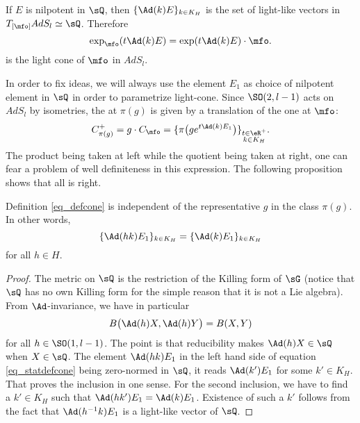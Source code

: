 \begin{corollary}		\label{CorNilLightQ}
If $E$ is nilpotent in $\sQ$, then $\{\Ad(k)E\}_{k\in K_H}$ is the set of light-like vectors in $T_{[\mfo]}AdS_l\simeq\sQ$. Therefore
\begin{equation}
  \exp_{\mfo}( t\Ad(k)E )=\exp(t\Ad(k)E)\cdot\mfo.
\end{equation}
is the light cone of $\mfo$ in $AdS_l$.
\end{corollary}

In order to fix ideas, we will always use the element $E_1$ as choice of nilpotent element in $\sQ$ in order to parametrize light-cone.  Since $\SO(2,l-1)$ acts on $AdS_l$ by isometries, the  at $\pi(g)$ is given by a translation of the one at $\mfo$:
\begin{equation}	\label{eq_defcone}
  C^+_{\pi(g)}=g\cdot C_{\mfo}=\{  \pi\big( g e^{t\Ad(k)E_1}  \big)  \}_{\substack{t\in\eR^+\\ k\in K_H}}.
\end{equation} 
The product being taken at left while the quotient being taken at right, one can fear a problem of well definiteness in this expression. The following proposition shows that all is right.

\begin{proposition}		\label{PropDefConeIndepRepre}
Definition \eqref{eq_defcone} is independent of the representative $g$ in the class $\pi(g)$. In other words,
\begin{equation}  \label{eq_statdefcone}
  \{ \Ad(hk)E_1 \}_{k\in K_H}=\{ \Ad(k)E_1 \}_{k\in K_H}
\end{equation} 
for all $h\in H$. 
\end{proposition}

\begin{proof}
The metric on $\sQ$ is the restriction of the Killing form of $\sG$ (notice that $\sQ$ has no own Killing form for the simple reason that it is not a Lie algebra). From $\Ad$-invariance, we have in particular
\[
  B\big(\Ad(h)X,\Ad(h)Y \big)=B(X,Y)
\]
for all $h\in \SO(1,l-1)$. The point is that reducibility makes $\Ad(h)X\in\sQ$ when $X\in\sQ$. The element $\Ad(hk)E_1$ in the left hand side of equation \eqref{eq_statdefcone} being zero-normed in $\sQ$, it reads $\Ad(k')E_1$ for some $k'\in K_H$. That proves the inclusion in one sense. For the second inclusion, we have to find a $k'\in K_H$ such that $\Ad(hk')E_1=\Ad(k)E_1$. Existence of such a $k'$ follows from the fact that $\Ad(h^{-1}k)E_1$ is a light-like vector of $\sQ$.
\end{proof}

